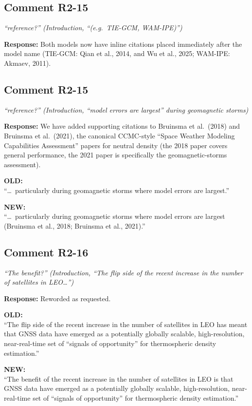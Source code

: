\documentclass[11pt]{article}
\newcommand{\reviewercomment}[1]{%
  \medskip
  \noindent\textit{\color{reviewblue}#1}%
  \medskip
}
\newcommand{\oldtext}[1]{%
  \smallskip
  \noindent\hspace{1em}\begin{minipage}{0.92\textwidth}%
  \color{quotegray}\textbf{OLD:}\\[2pt]``#1''%
  \end{minipage}%
  \smallskip
}
\newcommand{\newtext}[1]{%
  \smallskip
  \noindent\hspace{1em}\begin{minipage}{0.92\textwidth}%
  \color{quotegreen}\textbf{NEW:}\\[2pt]``#1''%
  \end{minipage}%
  \smallskip
}
\begin{document}
\subsection{Comment R2-15}

\reviewercomment{%
``reference?'' (Introduction, ``(e.g.\ TIE-GCM, WAM-IPE)'')}

\textbf{Response:}
Both models now have inline citations placed immediately after the
model name (TIE-GCM: Qian et al., 2014, and Wu et al., 2025; WAM-IPE:
Akmaev, 2011).


\subsection{Comment R2-15}

\reviewercomment{%
``reference?'' (Introduction, ``model errors are largest'' during
geomagnetic storms)}

\textbf{Response:}
We have added supporting citations to Bruinsma et al.\ (2018) and
Bruinsma et al.\ (2021), the canonical CCMC-style ``Space Weather
Modeling Capabilities Assessment'' papers for neutral density (the
2018 paper covers general performance, the 2021 paper is specifically
the geomagnetic-storms assessment).

\oldtext{\dots\ particularly during geomagnetic storms where model errors are largest.}

\newtext{\dots\ particularly during geomagnetic storms where model errors are largest (Bruinsma et al., 2018; Bruinsma et al., 2021).}


\subsection{Comment R2-16}

\reviewercomment{%
``The benefit?'' (Introduction, ``The flip side of the recent increase
in the number of satellites in LEO\ldots'')}

\textbf{Response:}
Reworded as requested.

\oldtext{The flip side of the recent increase in the number of satellites in LEO has meant that GNSS data have emerged as a potentially globally scalable, high-resolution, near-real-time set of ``signals of opportunity'' for thermospheric density estimation.}

\newtext{The benefit of the recent increase in the number of satellites in LEO is that GNSS data have emerged as a potentially globally scalable, high-resolution, near-real-time set of ``signals of opportunity'' for thermospheric density estimation.}
\end{document}
